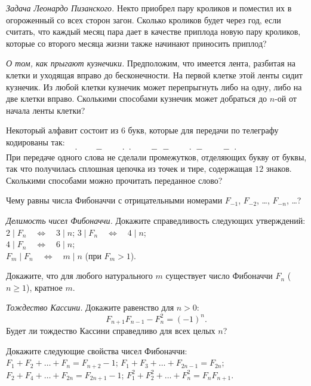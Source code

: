 \begin{problems}

\item\emph{Задача Леонардо Пизанского.}
Некто приобрел пару кроликов и поместил их в огороженный со всех сторон загон.
Сколько кроликов будет через год, если считать, что каждый месяц пара дает в
качестве приплода новую пару кроликов, которые со второго месяца жизни также
начинают приносить приплод?

\item\label{kuz}\emph{О том, как прыгают кузнечики.}
Предположим, что имеется лента, разбитая на клетки и уходящая вправо до
бесконечности.
На первой клетке этой ленты сидит кузнечик.
Из любой клетки кузнечик может перепрыгнуть либо на одну, либо на две клетки
вправо.
Сколькими способами кузнечик может добраться до $n$-ой от начала ленты клетки?

\item
Некоторый алфавит состоит из $6$ букв,
которые для передачи по телеграфу кодированы так:
\[
    \cdot
\qquad
    -
\qquad
    {\cdot}\,{\cdot}
\qquad
    {-}\,{-}
\qquad
    {\cdot}\,{-}
\qquad
    {-}\,{\cdot}
\]
При передаче одного слова не сделали промежутков, отделяющих букву от буквы,
так что получилась сплошная цепочка из точек и тире, содержащая $12$ знаков.
Сколькими способами можно прочитать переданное слово?

\item
Чему равны числа Фибоначчи с отрицательными номерами
$F_{-1}$, $F_{-2}$, \ldots, $F_{-n}$, \ldots?

\item\emph{Делимость чисел Фибоначчи.}
Докажите справедливость следующих утверждений:
\\
\sbp $2 \mid F_n \quad\Leftrightarrow\quad 3 \mid n$;
\qquad
\sbp $3 \mid F_n \quad\Leftrightarrow\quad 4 \mid n$;
\\
\sbp $4 \mid F_n \quad\Leftrightarrow\quad 6 \mid n$;
\\
\sbp $F_m \mid F_n \quad\Leftrightarrow\quad m \mid n$ (при $F_m > 1$).

\item
Докажите, что для любого натурального $m$ существует число Фибоначчи
$F_n$ ($n \geq 1$), кратное $m$.

\item\emph{Тождество Кассини.}
Докажите равенство для $n > 0$:
\[
    F_{n+1} F_{n-1} - F_n^2
=
    (-1)^n
.\]
Будет ли тождество Кассини справедливо для всех целых $n$?

\item
Докажите следующие свойства чисел Фибоначчи:
\\
\sbp $F_1 + F_2 + \ldots + F_n = F_{n+2} - 1$;
\qquad
\sbp $F_1 + F_3 + \ldots + F_{2n-1} = F_{2n}$;
\\
\sbp $F_2 + F_4 + \ldots + F_{2n} = F_{2n+1} - 1$;
\qquad
\sbp $F_1^2 + F_2^2 + \ldots + F_n^2 = F_n F_{n+1}$.


\end{problems}
